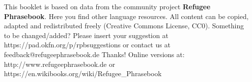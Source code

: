 This booklet is based on data from the community project \textbf{Refugee Phrasebook}. Here you find other language resources.\newline
All content can be copied, adapted and redistributed freely (Creative Commons License, CC0). \newline
\newline
Something to be changed/added?\newline 
\newline
Please insert your suggestion at https://pad.okfn.org/p/rpbsuggestions or contact us at feedback@refugeephrasebook.de\newline
Thanks! Online versions at: 
http://www.refugeephrasebook.de or https://en.wikibooks.org/wiki/Refugee\_Phrasebook
